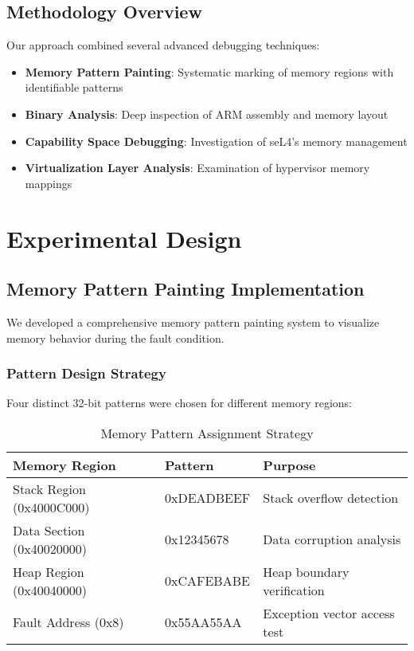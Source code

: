 \documentclass[11pt,a4paper]{article}
\begin{document}
\subsection{Methodology Overview}

Our approach combined several advanced debugging techniques:
\begin{itemize}
    \item \textbf{Memory Pattern Painting}: Systematic marking of memory regions with identifiable patterns
    \item \textbf{Binary Analysis}: Deep inspection of ARM assembly and memory layout
    \item \textbf{Capability Space Debugging}: Investigation of seL4's memory management
    \item \textbf{Virtualization Layer Analysis}: Examination of hypervisor memory mappings
\end{itemize}

\section{Experimental Design}

\subsection{Memory Pattern Painting Implementation}

We developed a comprehensive memory pattern painting system to visualize memory behavior during the fault condition.

\subsubsection{Pattern Design Strategy}

Four distinct 32-bit patterns were chosen for different memory regions:

\begin{table}[h]
\centering
\begin{tabular}{@{}lll@{}}
\toprule
\textbf{Memory Region} & \textbf{Pattern} & \textbf{Purpose} \\
\midrule
Stack Region (0x4000C000) & 0xDEADBEEF & Stack overflow detection \\
Data Section (0x40020000) & 0x12345678 & Data corruption analysis \\
Heap Region (0x40040000) & 0xCAFEBABE & Heap boundary verification \\
Fault Address (0x8) & 0x55AA55AA & Exception vector access test \\
\bottomrule
\end{tabular}
\caption{Memory Pattern Assignment Strategy}
\label{tab:patterns}
\end{table}
\end{document}
